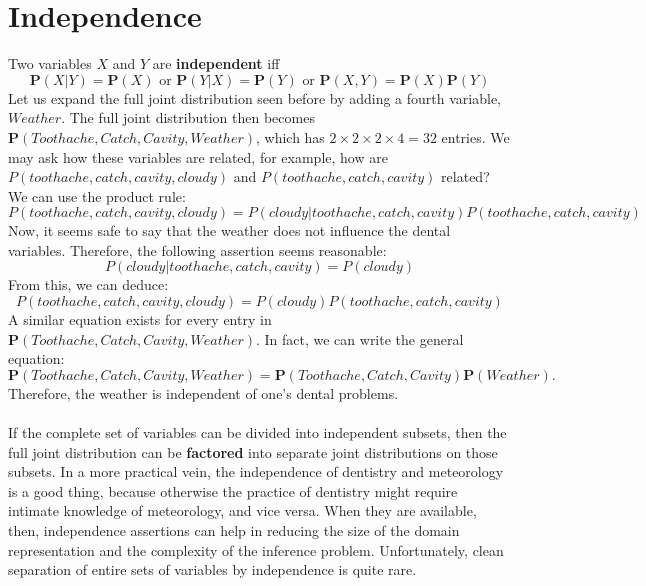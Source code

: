 \section{Independence}
Two variables $X$ and $Y$ are \textbf{independent} iff
\[\textbf{P}(X | Y ) = \textbf{P}(X)\,\, \text{or} \,\,\textbf{P}(Y | X) = \textbf{P}(Y)\,\, \text{or}\,\, \textbf{P}(X, Y ) = \textbf{P}(X)\textbf{P}(Y )\]
Let us expand the full joint distribution seen before by adding a fourth variable, $Weather$. The full joint distribution then becomes $\textbf{P}(Toothache, Catch, Cavity,Weather )$, which has $2 \times 2 \times 2 \times 4 = 32$ entries. We may ask how these variables are related, for example, how are $P(toothache, catch, cavity, cloudy)$
and $P(toothache, catch, cavity)$ related? We can use the product rule:
\[P(toothache, catch, cavity, cloudy)
= P(cloudy |toothache, catch, cavity)P(toothache, catch, cavity)\]
Now, it seems safe to say that the weather does not influence the dental variables. Therefore, the following assertion seems reasonable:
\[P(cloudy |toothache, catch, cavity) = P(cloudy)\]
From this, we can deduce:
\[P(toothache, catch, cavity, cloudy) = P(cloudy)P(toothache, catch, cavity)\]
A similar equation exists for every entry in $\textbf{P}(Toothache, Catch, Cavity,Weather)$. In fact, we can write the general equation:
\[\textbf{P}(Toothache, Catch, Cavity, Weather ) = \textbf{P}(Toothache, Catch, Cavity)\textbf{P}(Weather ) .\]
Therefore, the weather is independent of one’s dental problems.\\\\
If the complete set of variables can be divided into independent subsets, then the full joint distribution can be \textbf{factored} into separate joint distributions on those subsets. In a more practical vein, the independence of
dentistry and meteorology is a good thing, because otherwise the practice of dentistry might require intimate knowledge of meteorology, and vice versa. When they are available, then, independence assertions can help in reducing the size of
the domain representation and the complexity of the inference problem. Unfortunately, clean separation of entire sets of variables by independence is quite rare.

